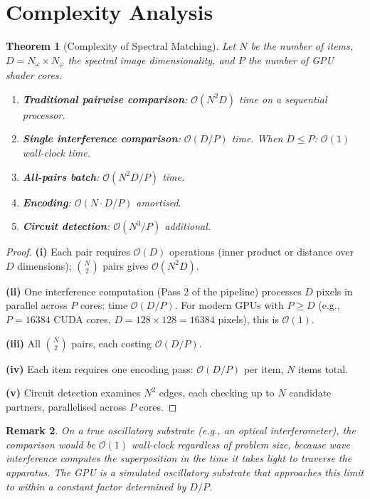 \documentclass[11pt,twocolumn,a4paper]{article}
\newtheorem{theorem}{Theorem}[section]
\newtheorem{remark}[theorem]{Remark}
\newcommand{\BigO}{\mathcal{O}}
\begin{document}
\section{Complexity Analysis}
\label{sec:complexity}

\begin{theorem}[Complexity of Spectral Matching]
\label{thm:complexity}
Let $N$ be the number of items, $D = N_\omega \times N_\varphi$ the
spectral image dimensionality, and $P$ the number of GPU shader cores.
\begin{enumerate}[label=(\roman*),nosep]
  \item \textbf{Traditional pairwise comparison}: $\BigO(N^2 D)$ time
    on a sequential processor.
  \item \textbf{Single interference comparison}: $\BigO(D/P)$ time.
    When $D \leq P$: $\BigO(1)$ wall-clock time.
  \item \textbf{All-pairs batch}: $\BigO(N^2 D / P)$ time.
  \item \textbf{Encoding}: $\BigO(N \cdot D / P)$ amortised.
  \item \textbf{Circuit detection}: $\BigO(N^3 / P)$ additional.
\end{enumerate}
\end{theorem}

\begin{proof}
\textbf{(i)} Each pair requires $\BigO(D)$ operations (inner product or
distance over $D$ dimensions); $\binom{N}{2}$ pairs gives $\BigO(N^2 D)$.

\textbf{(ii)} One interference computation (Pass 2 of the pipeline)
processes $D$ pixels in parallel across $P$ cores: time $\BigO(D/P)$.
For modern GPUs with $P \geq D$ (e.g., $P = 16384$ CUDA cores,
$D = 128 \times 128 = 16384$ pixels), this is $\BigO(1)$.

\textbf{(iii)} All $\binom{N}{2}$ pairs, each costing $\BigO(D/P)$.

\textbf{(iv)} Each item requires one encoding pass: $\BigO(D/P)$ per
item, $N$ items total.

\textbf{(v)} Circuit detection examines $N^2$ edges, each checking up
to $N$ candidate partners, parallelised across $P$ cores.
\end{proof}

\begin{remark}
On a true oscillatory substrate (e.g., an optical interferometer), the
comparison would be $\BigO(1)$ wall-clock regardless of problem size,
because wave interference computes the superposition in the time it
takes light to traverse the apparatus. The GPU is a \emph{simulated}
oscillatory substrate that approaches this limit to within a constant
factor determined by $D/P$.
\end{remark}
\end{document}

